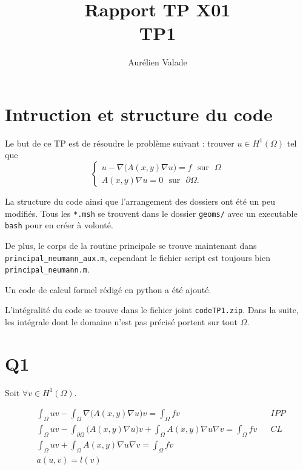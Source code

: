 \documentclass[11pt]{article}
\title{Rapport TP X01 \\ TP1}
\author{Aurélien Valade}
\date{}
\newcommand{\ms}{~~~}
\begin{document}
\maketitle

\section{Intruction et structure du code}


Le but de ce TP est de résoudre le problème suivant : trouver $u \in H^1(\Omega)$ tel que  
\begin{equation}
  \begin{cases}
    u - \nabla \big(A(x,y) \nabla u\big) = f \ms \mbox{sur}\ms \Omega\\
    A(x,y) \nabla u = 0 \ms \mbox{sur}\ms \partial\Omega.
  \end{cases}
\end{equation}

La structure du code ainsi que l'arrangement des dossiers ont été un peu modifiés. Tous les \texttt{*.msh} se trouvent dans le dossier \texttt{geoms/} avec un executable \texttt{bash} pour en créer à volonté.

De plus, le corps de la routine principale se trouve maintenant dans \texttt{principal\_neumann\_aux.m}, cependant le fichier script est toujours bien \texttt{principal\_neumann.m}. 

Un code de calcul formel rédigé en python a été ajouté. 

L'intégralité du code se trouve dans le fichier joint \texttt{codeTP1.zip}.
Dans la suite, les intégrale dont le domaine n'est pas précisé portent sur tout $\Omega$.
\section{Q1}

Soit $\forall v\in H^1(\Omega)$.

\begin{align}
  \label{eq:var}
  &\int_{\Omega} uv - \int_{\Omega} \nabla \big(A(x,y) \nabla u\big) v = \int_{\Omega} f v && IPP \\
  &\int_{\Omega} uv - \int_{\partial \Omega} \big(A(x,y) \nabla u\big) v + \int_{ \Omega} A(x,y) \nabla u \nabla v  = \int_{\Omega} f v  && CL\\
  &\int_{\Omega} uv + \int_{ \Omega} A(x,y) \nabla u \nabla v  = \int_{\Omega} f v \\
  &a(u,v) = l(v)
\end{align}
\end{document}
